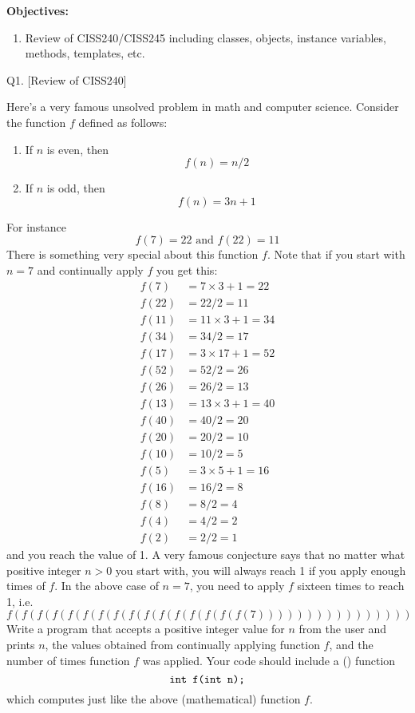 



\renewcommand\TITLE{Assignment 2}


\topmatter

\textbf{Objectives:}
\begin{enumerate}[topsep=0pt]
\item Review of CISS240/CISS245 including classes, objects, instance variables,
methods, templates, etc.
\end{enumerate}

\newpage

\newpage
Q1. [Review of CISS240]

Here's a very famous unsolved problem in math and computer science. 
Consider the function $f$
defined as follows:
\begin{enumerate}
\item If $n$ is even, then
\[
f(n) = n/2
\]
\item If $n$ is odd, then
\[
f(n) = 3n + 1
\]
\end{enumerate}
For instance
\[
f(7) = 22 \text{ and } f(22) = 11
\]
There is something very special about this function $f$. 
Note that if you start with $n=7$ and continually
apply $f$ you get this:
\begin{align*}
f(7)  &= 7 \times 3 + 1 = 22 \\
f(22) &= 22/2 = 11 \\
f(11) &= 11 \times 3 + 1 = 34 \\
f(34) &= 34/2 = 17 \\
f(17) &= 3 \times 17 + 1 = 52 \\
f(52) &= 52/2 = 26 \\
f(26) &= 26/2 = 13 \\
f(13) &= 13 \times 3 + 1 = 40 \\
f(40) &= 40/2 = 20 \\
f(20) &= 20/2 = 10 \\
f(10) &= 10/2 = 5 \\
f(5)  &= 3 \times 5 + 1 = 16 \\
f(16) &= 16/2 = 8 \\
f(8)  &= 8/2 = 4 \\
f(4)  &= 4/2 = 2 \\
f(2)  &= 2/2 = 1
\end{align*}
and you reach the value of 1. 
A very famous conjecture says that no matter what positive integer $n > 0$
you start with, you will always reach 1 if you apply enough times of $f$.
In the above case of $n = 7$, 
you need to apply $f$ sixteen times to reach 1, i.e.
\[
f(f(f(f(f(f(f(f(f(f(f(f(f(f(f(f(7))))))))))))))))
\]
Write a program that accepts a positive integer value for $n$ 
from the user and prints $n$, the values
obtained from continually applying function $f$, 
and the number of times function $f$ was applied.
Your code should include a (\cpp) function
\[
\verb!int f(int n);!
\]
which computes just like the above (mathematical) function $f$.


